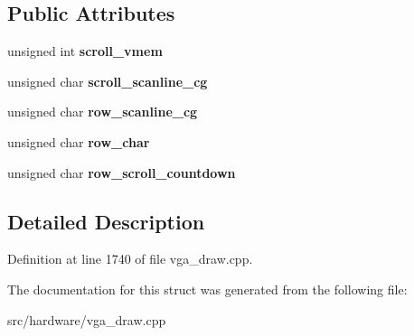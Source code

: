\subsection*{Public Attributes}
\begin{DoxyCompactItemize}
\item 
\hypertarget{structText__Draw__State_a72dcde92c1d0b0338acc888a51f30914}{unsigned int {\bfseries scroll\-\_\-vmem}}\label{structText__Draw__State_a72dcde92c1d0b0338acc888a51f30914}

\item 
\hypertarget{structText__Draw__State_ad34090de4ca22fb0777f5eb7056cf5e9}{unsigned char {\bfseries scroll\-\_\-scanline\-\_\-cg}}\label{structText__Draw__State_ad34090de4ca22fb0777f5eb7056cf5e9}

\item 
\hypertarget{structText__Draw__State_a699f693c31130b23e9ba2380e8c80f20}{unsigned char {\bfseries row\-\_\-scanline\-\_\-cg}}\label{structText__Draw__State_a699f693c31130b23e9ba2380e8c80f20}

\item 
\hypertarget{structText__Draw__State_a806bd82f87fd54eb3186dabad62f5771}{unsigned char {\bfseries row\-\_\-char}}\label{structText__Draw__State_a806bd82f87fd54eb3186dabad62f5771}

\item 
\hypertarget{structText__Draw__State_a013c45ffb9b60f0dc579952522746518}{unsigned char {\bfseries row\-\_\-scroll\-\_\-countdown}}\label{structText__Draw__State_a013c45ffb9b60f0dc579952522746518}

\end{DoxyCompactItemize}


\subsection{Detailed Description}


Definition at line 1740 of file vga\-\_\-draw.\-cpp.



The documentation for this struct was generated from the following file\-:\begin{DoxyCompactItemize}
\item 
src/hardware/vga\-\_\-draw.\-cpp\end{DoxyCompactItemize}
